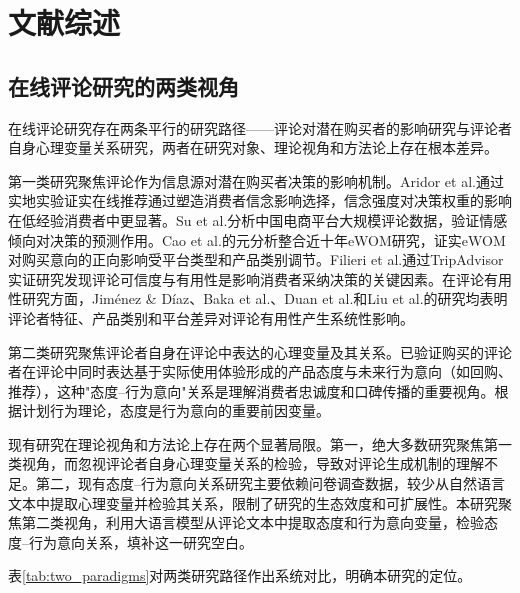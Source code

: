 \section{文献综述}

\subsection{在线评论研究的两类视角}

在线评论研究存在两条平行的研究路径——评论对潜在购买者的影响研究与评论者自身心理变量关系研究，两者在研究对象、理论视角和方法论上存在根本差异。

第一类研究聚焦评论作为信息源对潜在购买者决策的影响机制。Aridor et al.\cite{aridor2022}通过实地实验证实在线推荐通过塑造消费者信念影响选择，信念强度对决策权重的影响在低经验消费者中更显著。Su et al.\cite{su2022}分析中国电商平台大规模评论数据，验证情感倾向对决策的预测作用。Cao et al.\cite{cao2021}的元分析整合近十年eWOM研究，证实eWOM对购买意向的正向影响受平台类型和产品类别调节。Filieri et al.\cite{filieri2022}通过TripAdvisor实证研究发现评论可信度与有用性是影响消费者采纳决策的关键因素。在评论有用性研究方面，Jiménez \& Díaz\cite{jimenez2022}、Baka et al.\cite{baka2022}、Duan et al.\cite{duan2023}和Liu et al.\cite{liu2022}的研究均表明评论者特征、产品类别和平台差异对评论有用性产生系统性影响。

第二类研究聚焦评论者自身在评论中表达的心理变量及其关系。已验证购买的评论者在评论中同时表达基于实际使用体验形成的产品态度与未来行为意向（如回购、推荐），这种"态度--行为意向"关系是理解消费者忠诚度和口碑传播的重要视角。根据计划行为理论\cite{ajzen1991}，态度是行为意向的重要前因变量。

现有研究在理论视角和方法论上存在两个显著局限。第一，绝大多数研究聚焦第一类视角，而忽视评论者自身心理变量关系的检验，导致对评论生成机制的理解不足。第二，现有态度--行为意向关系研究主要依赖问卷调查数据，较少从自然语言文本中提取心理变量并检验其关系，限制了研究的生态效度和可扩展性。本研究聚焦第二类视角，利用大语言模型从评论文本中提取态度和行为意向变量，检验态度--行为意向关系，填补这一研究空白。

表\ref{tab:two_paradigms}对两类研究路径作出系统对比，明确本研究的定位。

